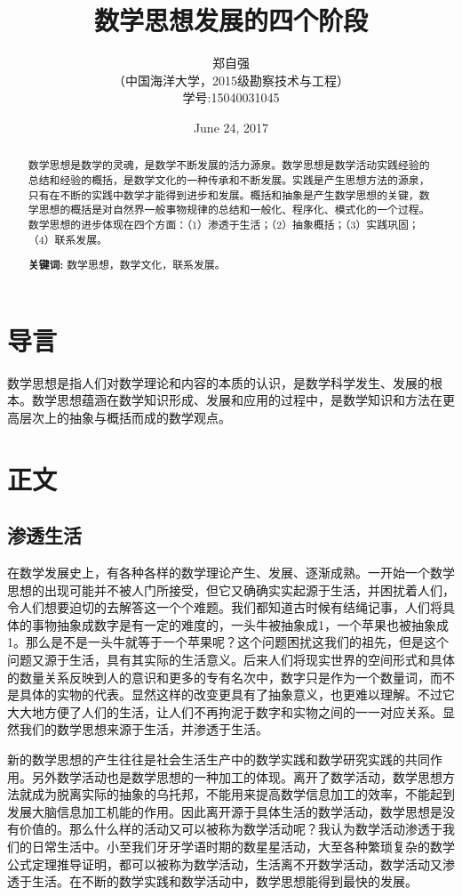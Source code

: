 \documentclass[UTF8,adobefonts]{ctexart}
\title{数学思想发展的四个阶段}
\author{郑自强\\
\normalsize
（中国海洋大学，2015级勘察技术与工程） \\[2pt]
学号:15040031045 \\[1.5pt]}
\date{June 24, 2017}
\begin{document}
\maketitle      %

\begin{abstract}
数学思想是数学的灵魂，是数学不断发展的活力源泉。数学思想是数学活动实践经验的总结和经验的概括，是数学文化的一种传承和不断发展。实践是产生思想方法的源泉，只有在不断的实践中数学才能得到进步和发展。概括和抽象是产生数学思想的关键，数学思想的概括是对自然界一般事物规律的总结和一般化、程序化、模式化的一个过程。数学思想的进步体现在四个方面：（1）渗透于生活；（2）抽象概括；（3）实践巩固；（4）联系发展。\par
\textbf{关键词:} 数学思想，数学文化，联系发展。
\end{abstract}
 
\section{导言}
数学思想是指人们对数学理论和内容的本质的认识，是数学科学发生、发展的根本。数学思想蕴涵在数学知识形成、发展和应用的过程中，是数学知识和方法在更高层次上的抽象与概括而成的数学观点。
\section{正文}
\subsection{渗透生活}
在数学发展史上，有各种各样的数学理论产生、发展、逐渐成熟。一开始一个数学思想的出现可能并不被人门所接受，但它又确确实实起源于生活，并困扰着人们，令人们想要迫切的去解答这一个个难题。我们都知道古时候有结绳记事，人们将具体的事物抽象成数字是有一定的难度的，一头牛被抽象成1，一个苹果也被抽象成1。那么是不是一头牛就等于一个苹果呢？这个问题困扰这我们的祖先，但是这个问题又源于生活，具有其实际的生活意义。后来人们将现实世界的空间形式和具体的数量关系反映到人的意识和更多的专有名次中，数字只是作为一个数量词，而不是具体的实物的代表。显然这样的改变更具有了抽象意义，也更难以理解。不过它大大地方便了人们的生活，让人们不再拘泥于数字和实物之间的一一对应关系。显然我们的数学思想来源于生活，并渗透于生活。\par
新的数学思想的产生往往是社会生活生产中的数学实践和数学研究实践的共同作用。另外数学活动也是数学思想的一种加工的体现。离开了数学活动，数学思想方法就成为脱离实际的抽象的乌托邦，不能用来提高数学信息加工的效率，不能起到发展大脑信息加工机能的作用。因此离开源于具体生活的数学活动，数学思想是没有价值的。那么什么样的活动又可以被称为数学活动呢？我认为数学活动渗透于我们的日常生活中。小至我们牙牙学语时期的数星星活动，大至各种繁琐复杂的数学公式定理推导证明，都可以被称为数学活动，生活离不开数学活动，数学活动又渗透于生活。在不断的数学实践和数学活动中，数学思想能得到最快的发展\cite{黄秦安2001数学文化观念下的数学素质教育}。
\end{document}
